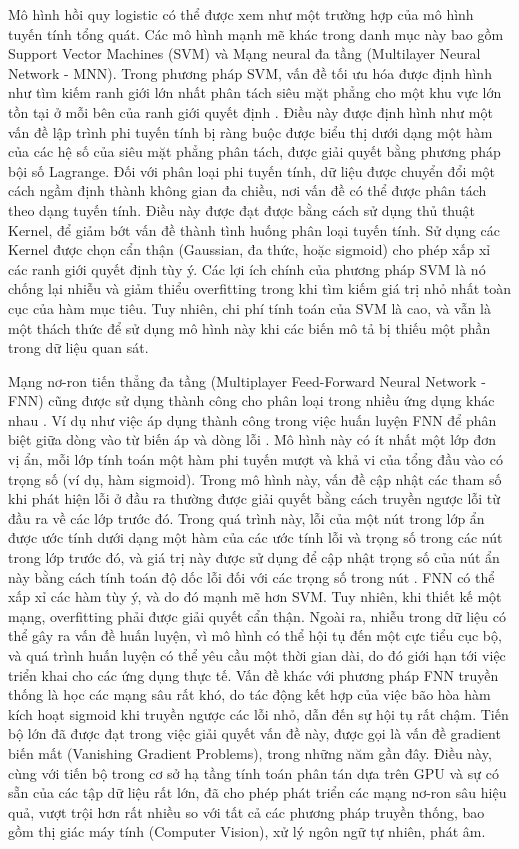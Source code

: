 \documentclass[utf8]{frontiersSCNS} %
\begin{document}
Mô hình hồi quy logistic có thể được xem như một trường hợp của mô hình tuyến tính tổng quát. Các mô hình mạnh mẽ khác trong danh mục này bao gồm Support Vector Machines (SVM) và Mạng neural đa tầng (Multilayer Neural Network - MNN). Trong phương pháp SVM, vấn đề tối ưu hóa được định hình như tìm kiếm ranh giới lớn nhất phân tách siêu mặt phẳng cho một khu vực lớn tồn tại ở mỗi bên của ranh giới quyết định \citep{Cortes1995}. Điều này được định hình như một vấn đề lập trình phi tuyến tính bị ràng buộc được biểu thị dưới dạng một hàm của các hệ số của siêu mặt phẳng phân tách, được giải quyết bằng phương pháp bội số Lagrange. Đối với phân loại phi tuyến tính, dữ liệu được chuyển đổi một cách ngầm định thành không gian đa chiều, nơi vấn đề có thể được phân tách theo dạng tuyến tính. Điều này được đạt được bằng cách sử dụng thủ thuật Kernel, để giảm bớt vấn đề thành tình huống phân loại tuyến tính. Sử dụng các Kernel được chọn cẩn thận (Gaussian, đa thức, hoặc sigmoid) cho phép xấp xỉ các ranh giới quyết định tùy ý. Các lợi ích chính của phương pháp SVM là nó chống lại nhiễu và giảm thiểu overfitting trong khi tìm kiếm giá trị nhỏ nhất toàn cục của hàm mục tiêu. Tuy nhiên, chi phí tính toán của SVM là cao, và vẫn là một thách thức để sử dụng mô hình này khi các biến mô tả bị thiếu một phần trong dữ liệu quan sát.

Mạng nơ-ron tiến thẳng đa tầng (Multiplayer Feed-Forward Neural Network - FNN) cũng được sử dụng thành công cho phân loại trong nhiều ứng dụng khác nhau \citep{Zhang2000}. Ví dụ như việc áp dụng thành công trong việc huấn luyện FNN để phân biệt giữa dòng vào từ biến áp và dòng lỗi \citep{Perez1994}. Mô hình này có ít nhất một lớp đơn vị ẩn, mỗi lớp tính toán một hàm phi tuyến mượt và khả vi của tổng đầu vào có trọng số (ví dụ, hàm sigmoid). Trong mô hình này, vấn đề cập nhật các tham số khi phát hiện lỗi ở đầu ra thường được giải quyết bằng cách truyền ngược lỗi từ đầu ra về các lớp trước đó. Trong quá trình này, lỗi của một nút trong lớp ẩn được ước tính dưới dạng một hàm của các ước tính lỗi và trọng số trong các nút trong lớp trước đó, và giá trị này được sử dụng để cập nhật trọng số của nút ẩn này bằng cách tính toán độ dốc lỗi đối với các trọng số trong nút \citep{Werbos1994}. FNN có thể xấp xỉ các hàm tùy ý, và do đó mạnh mẽ hơn SVM. Tuy nhiên, khi thiết kế một mạng, overfitting phải được giải quyết cẩn thận. Ngoài ra, nhiễu trong dữ liệu có thể gây ra vấn đề huấn luyện, vì mô hình có thể hội tụ đến một cực tiểu cục bộ, và quá trình huấn luyện có thể yêu cầu một thời gian dài, do đó giới hạn tới việc triển khai cho các ứng dụng thực tế. Vấn đề khác với phương pháp FNN truyền thống là học các mạng sâu rất khó, do tác động kết hợp của việc bão hòa hàm kích hoạt sigmoid khi truyền ngược các lỗi nhỏ, dẫn đến sự hội tụ rất chậm. Tiến bộ lớn đã được đạt trong việc giải quyết vấn đề này, được gọi là vấn đề gradient biến mất (Vanishing Gradient Problems), trong những năm gần đây. Điều này, cùng với tiến bộ trong cơ sở hạ tầng tính toán phân tán dựa trên GPU và sự có sẵn của các tập dữ liệu rất lớn, đã cho phép phát triển các mạng nơ-ron sâu hiệu quả, vượt trội hơn rất nhiều so với tất cả các phương pháp truyền thống, bao gồm thị giác máy tính (Computer Vision), xử lý ngôn ngữ tự nhiên, phát âm. 
\end{document}
